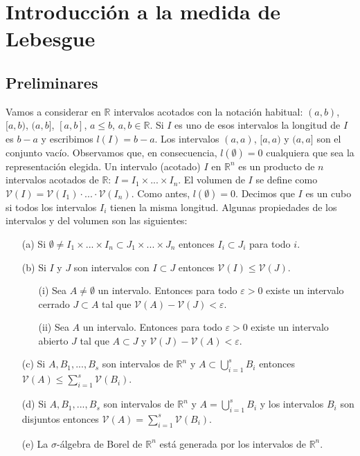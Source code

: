 \section{Introducción a la medida de Lebesgue}
\subsection{Preliminares}
Vamos a considerar en $\mathbb{R}$ intervalos acotados con la notación habitual: $(a, b)$, $[a, b)$, $(a, b]$, $[a, b]$, $a \leq b$, $a, b \in \mathbb{R}$. Si $I$ es uno de esos intervalos la longitud de $I$ es $b - a$ y escribimos $l(I) = b - a$. Los intervalos $(a, a)$, $[a, a)$ y $(a, a]$ son el conjunto vacío.
Observamos que, en consecuencia, $l(\emptyset) = 0$ cualquiera que sea la representación elegida.
\newline
Un intervalo (acotado) $I$ en $\mathbb{R}^n$ es un producto de $n$ intervalos acotados de $\mathbb{R}$: $I = I_1 \times ... \times I_n$. El volumen de $I$ se define como $\mathcal{V}(I) = \mathcal{V}(I_1) \cdot ... \cdot \mathcal{V}(I_n)$. Como antes, $l(\emptyset) = 0$. Decimos que $I$ es un cubo si todos los intervalos $I_i$ tienen la misma longitud. Algunas propiedades de los intervalos y del volumen son las siguientes:
\begin{enumerate}
    \item[(a)] Si $\emptyset \not = I_1 \times ... \times I_n \subset J_1 \times ... \times J_n$ entonces $I_i \subset J_i$ para todo $i$.
    \item[(b)] Si $I$ y $J$ son intervalos con $I \subset J$ entonces $\mathcal{V}(I) \leq \mathcal{V}(J)$.
    \begin{enumerate}
        \item[(i)] Sea $A \not = \emptyset$ un intervalo. Entonces para todo $\varepsilon > 0$ existe un intervalo cerrado $J \subset A$ tal que $\mathcal{V}(A) - \mathcal{V}(J) < \varepsilon$. 
        \item[(ii)] Sea $A$ un intervalo. Entonces para todo $\varepsilon > 0$ existe un intervalo abierto $J$ tal que $A \subset J$ y $\mathcal{V}(J) - \mathcal{V}(A) < \varepsilon$.
    \end{enumerate}
    \item[(c)] Si $A, B_1,..., B_s$ son intervalos de $\mathbb{R}^n$ y $A \subset \bigcup_{i=1}^{s}{B_i}$ entonces $\mathcal{V}(A) \leq \sum_{i=1}^{s}{\mathcal{V}(B_i)}$.
    \item[(d)] Si $A, B_1,..., B_s$ son intervalos de $\mathbb{R}^n$ y $A = \bigcup_{i=1}^{s}{B_i}$ y los intervalos $B_i$ son disjuntos entonces $\mathcal{V}(A) = \sum_{i=1}^{s}{\mathcal{V}(B_i)}$.
    \item[(e)] La $\sigma$-álgebra de Borel de $\mathbb{R}^n$ está generada por los intervalos de $\mathbb{R}^n$.
\end{enumerate}
